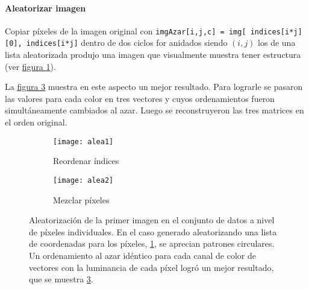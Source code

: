 \documentclass{article}
\begin{document}

\paragraph{Aleatorizar imagen} 
Copiar píxeles de la imagen original con \verb'imgAzar[i,j,c] = img[ indices[i*j][0], indices[i*j]' dentro de dos ciclos for anidados siendo \((i,j)\) los de una lista aleatorizada produjo una imagen que visualmente muestra tener estructura (ver \hyperref[fg:alea1]{figura \ref*{fg:alea1}}).

La \hyperref[fg:alea2]{figura \ref*{fg:alea2}} muestra en este aspecto un mejor resultado.
Para lograrle se pasaron las valores para cada color en tres vectores y cuyos ordenamientos fueron simultáneamente cambiados al azar.
Luego se reconstruyeron las tres matrices en el orden original.

\begin{figure}
	\centering
	\begin{subfigure}[b]{0.24\textwidth}
		\texttt{[image: alea1]}
		\caption{Reordenar índices}
		\label{fg:alea1}
	\end{subfigure}
	\begin{subfigure}[b]{0.24\textwidth}
		\texttt{[image: alea2]}
		\caption{Mezclar píxeles}
		\label{fg:alea2}
	\end{subfigure}
	\caption{Aleatorización de la primer imagen en el conjunto de datos a nivel de píxeles individuales. En el caso generado aleatorizando una lista de coordenadas para los píxeles, \hyperref[fg:alea1]{\ref*{fg:alea1}}, se aprecian patrones circulares. Un ordenamiento al azar idéntico para cada canal de color de vectores con la luminancia de cada píxel logró un mejor resultado, que se muestra \hyperref[fg:alea2]{\ref*{fg:alea2}}.
	}
\end{figure}


\end{document}
